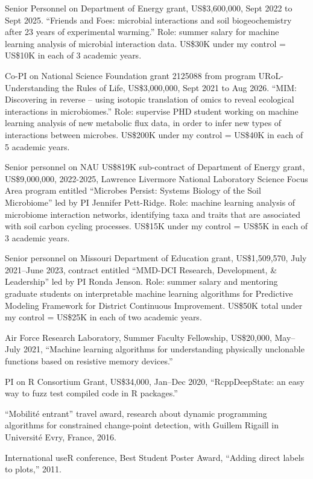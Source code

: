 \documentclass[margin,line]{res}
\begin{document}
\begin{resume}
Senior Personnel on Department of Energy grant, US\$3,600,000, Sept 2022 to
Sept 2025. ``Friends and Foes: microbial interactions and soil
biogeochemistry after 23 years of experimental warming.'' Role: summer
salary for machine learning analysis of microbial interaction data.
US\$30K under my control = US\$10K in each of 3 academic years.

Co-PI on National Science Foundation grant 2125088 from program URoL-Understanding the Rules of Life, US\$3,000,000, Sept 2021
to Aug 2026. ``MIM: Discovering in reverse – using isotopic
translation of omics to reveal ecological interactions in
microbiomes.'' Role: supervise PHD student working on machine learning
analysis of new metabolic flux data, in order to infer new types of
interactions between microbes. US\$200K under my control = US\$40K in
each of 5 academic years.

Senior personnel on NAU US\$819K sub-contract of Department of Energy
grant, US\$9,000,000, 2022-2025, Lawrence Livermore National
Laboratory Science Focus Area program entitled ``Microbes Persist:
Systems Biology of the Soil Microbiome'' led by PI Jennifer
Pett-Ridge. Role: machine learning analysis of microbiome interaction
networks, identifying taxa and traits that are associated with soil
carbon cycling processes. US\$15K under my control = US\$5K in each of
3 academic years.

Senior personnel on Missouri Department of Education grant,
US\$1,509,570, July 2021--June 2023, contract entitled ``MMD-DCI
Research, Development, \& Leadership'' led by PI Ronda Jenson. Role:
summer salary and mentoring graduate students on interpretable machine
learning algorithms for Predictive Modeling Framework for District
Continuous Improvement. US\$50K total under my control = US\$25K in
each of two academic years.

Air Force Research Laboratory, Summer Faculty Fellowship, US\$20,000,
May--July 2021, ``Machine learning algorithms for understanding
physically unclonable functions based on resistive memory devices.''

PI on R Consortium Grant, US\$34,000, Jan--Dec 2020, ``RcppDeepState: an easy
way to fuzz test compiled code in R packages.''

``Mobilit\'e entrant'' travel award, research about dynamic
programming algorithms for constrained change-point detection, with
Guillem Rigaill in Universit\'e Evry, France, 2016.

International useR conference, Best Student Poster Award, ``Adding
direct labels to plots,'' 2011.


\end{resume}
\end{document}
